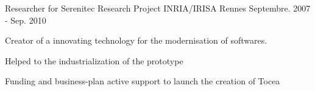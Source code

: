 \begin{cventries}
{\begin{cvitems}
      \end{cvitems}
    }

  \cventry
    {Researcher for Serenitec Research Project} %
    {INRIA/IRISA} %
    {Rennes} %
    {Septembre. 2007 - Sep. 2010} %
    {
      \begin{cvitems} %
        \item {Creator of a innovating technology for the modernisation of softwares.}
        \item {Helped to the industrialization of the prototype }
        \item {Funding and business-plan active support to launch the creation of Tocea}        
      \end{cvitems} 
    }


\end{cventries}
